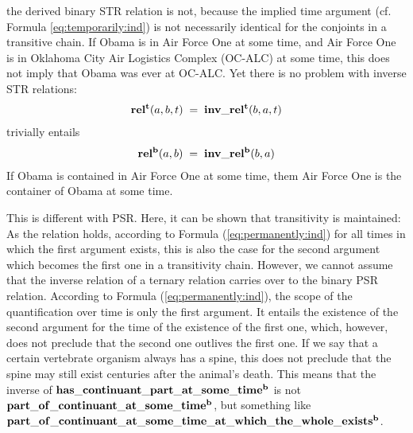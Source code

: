 %
the derived binary STR relation is not, because the implied time argument (cf. Formula \ref{eq:temporarily:ind}) is 
not necessarily identical for the conjoints in a transitive chain. If Obama is in Air Force One at some time, 
and Air Force One is in Oklahoma City Air Logistics Complex (OC-ALC) at some time, this does not imply that Obama 
was ever at OC-ALC. 
Yet there is no problem with inverse STR relations: 
% 
\begin{equation}
\begin{split}
\mathrm{\mathbf{rel^t}}(a,b,t) \; = \; \mathrm{\mathbf{inv\_rel^t}}(b,a,t)  
\end{split}
\label{eq:trinv}
\end{equation}    
%
trivially entails
%
\begin{equation}
\begin{split}
\mathrm{\mathbf{rel^b}}(a,b) \; = \; \mathrm{\mathbf{inv\_rel^b}}(b,a)  
\end{split}
\label{eq:trinv2}
\end{equation}    
%
If Obama is contained in Air Force One at some time, them Air Force One is the container of Obama at some time.

This is different with PSR. Here, it can be shown that transitivity is maintained: As the relation holds, according to Formula (\ref{eq:permanently:ind}) for all times in which the first argument exists, this is also the case for the second argument which becomes the first one in a transitivity chain.
However, we cannot assume that the inverse relation of a ternary relation carries over to the binary PSR relation. According to Formula (\ref{eq:permanently:ind}), the scope of the quantification over time is only the first argument. It entails the existence of the second argument for the time of the existence of the first one, which, however, does not preclude that the second one outlives the first one. If we say that a certain vertebrate organism always has a spine, this does not preclude that the spine may still exist centuries after the animal's death.    
This means that the inverse of $\mathrm{\mathbf{has\_continuant\_part\_at\_some\_time^b}}$ is not $\mathrm{\mathbf{part\_of\_continuant\_at\_some\_time^b}}$, but something like $\mathrm{\mathbf{part\_of\_continuant\_at\_some\_time\_at\_which\_the\_whole\_exists^b}}$.  

